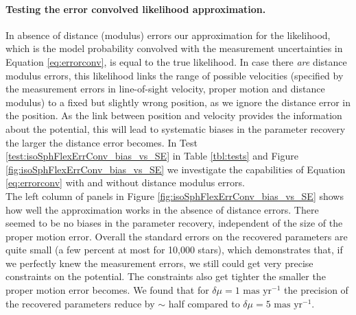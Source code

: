 \paragraph{Testing the error convolved likelihood approximation.}   In absence of distance (modulus) errors our approximation for the likelihood, which is the model probability convolved with the measurement uncertainties in Equation \ref{eq:errorconv}, is equal to the true likelihood. In case there \emph{are} distance modulus errors, this likelihood links the range of possible velocities (specified by the measurement errors in line-of-sight velocity, proper motion and distance modulus) to a fixed but slightly wrong position, as we ignore the distance error in the position. As the link between position and velocity provides the information about the potential, this will lead to systematic biases in the parameter recovery the larger the distance error becomes. In Test \ref{test:isoSphFlexErrConv_bias_vs_SE} in Table \ref{tbl:tests} and Figure \ref{fig:isoSphFlexErrConv_bias_vs_SE} we investigate the capabilities of Equation \ref{eq:errorconv} with and without distance modulus errors.
\\The left column of panels in Figure \ref{fig:isoSphFlexErrConv_bias_vs_SE} shows how well the approximation works in the absence of distance errors. There seemed to be no biases in the parameter recovery, independent of the size of the proper motion error. Overall the standard errors on the recovered parameters are quite small (a few percent at most for 10,000 stars), which demonstrates that, if we perfectly knew the measurement errors, we still could get very precise constraints on the potential. The constraints also get tighter the smaller the proper motion error becomes. We found that for $\delta \mu = 1 \text{ mas yr}^{-1}$ the precision of the recovered parameters reduce by $\sim$ half compared to $\delta \mu = 5 \text{ mas yr}^{-1}$. 
